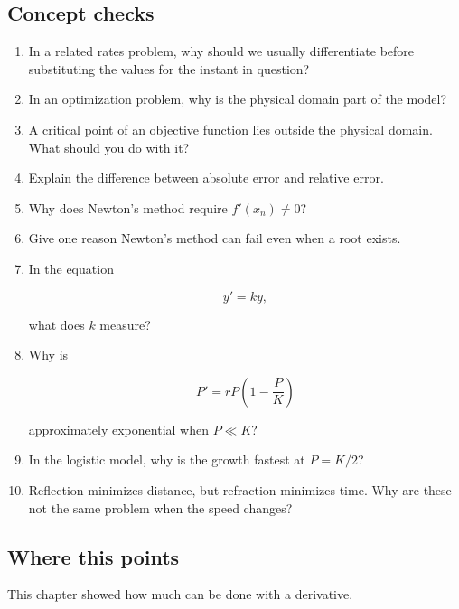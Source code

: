 \subsection{Concept checks}
\label{subsec:chapter7-concept-checks}

\begin{enumerate}
\item In a related rates problem, why should we usually differentiate before substituting
the values for the instant in question?

\item In an optimization problem, why is the physical domain part of the model?

\item A critical point of an objective function lies outside the physical domain.  What
should you do with it?

\item Explain the difference between absolute error and relative error.

\item Why does Newton's method require \(f'(x_n)\neq0\)?

\item Give one reason Newton's method can fail even when a root exists.

\item In the equation

\[
y'=ky,
\]

what does \(k\) measure?

\item Why is

\[
P'=rP\left(1-\frac{P}{K}\right)
\]

approximately exponential when \(P\ll K\)?

\item In the logistic model, why is the growth fastest at \(P=K/2\)?

\item Reflection minimizes distance, but refraction minimizes time.  Why are these not
the same problem when the speed changes?
\end{enumerate}

\subsection{Where this points}
\label{subsec:chapter7-hook-integrals}

This chapter showed how much can be done with a derivative.

